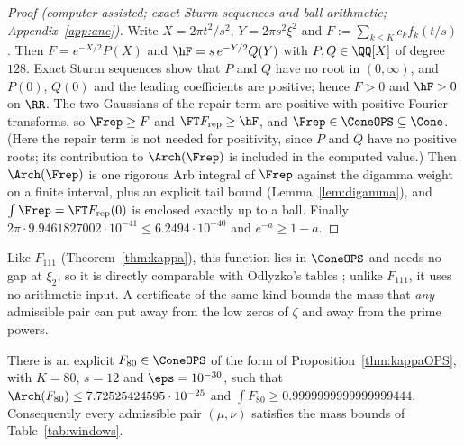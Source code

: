 \begin{proof}[Proof (computer-assisted; exact Sturm sequences and ball arithmetic; Appendix~\ref{app:anc})]
Write $X=2\pi t^2/s^2$, $Y=2\pi s^2\xi^2$ and $F:=\sum_{k\le K}c_kf_k(t/s)$. Then $F=e^{-X/2}P(X)$ and $\hF=s\,e^{-Y/2}Q(Y)$ with
$P,Q\in\QQ[X]$ of degree $128$. Exact Sturm sequences show that $P$ and $Q$ have no root in $(0,\infty)$, and $P(0)$,
$Q(0)$ and the leading coefficients are positive; hence $F>0$ and $\hF>0$ on $\RR$. The two Gaussians of the repair term are
positive with positive Fourier transforms, so $\Frep\ge F$ and $\FT F_{\mathrm{rep}}\ge\hF$, and $\Frep\in\ConeOPS\subseteq\Cone$. (Here
the repair term is not needed for positivity, since $P$ and $Q$ have no positive roots; its contribution to $\Arch(\Frep)$ is
included in the computed value.) Then $\Arch(\Frep)$ is one rigorous Arb integral of $\Frep$ against the digamma weight on a finite
interval, plus an explicit tail bound (Lemma~\ref{lem:digamma}), and $\int\Frep=\FT F_{\mathrm{rep}}(0)$ is enclosed exactly up to a ball. Finally
$2\pi\cdot9.9461827002\cdot10^{-41}\le6.2494\cdot10^{-40}$ and $e^{-a}\ge1-a$.
\end{proof}

Like $F_{111}$ (Theorem~\ref{thm:kappa}), this function lies in $\ConeOPS$ and needs no gap at $\xi_2$, so it is directly comparable with
Odlyzko's tables \cite[Table~4]{Odl90}; unlike $F_{111}$, it uses no arithmetic input. A certificate of the
same kind bounds the mass that \emph{any} admissible pair can put away from the low zeros of $\zeta$ and away from the prime powers.

\begin{proposition}\label{prop:lowheight}
There is an explicit $F_{80}\in\ConeOPS$ of the form of Proposition~\ref{thm:kappaOPS}, with $K=80$, $s=12$ and $\eps=10^{-30}$,
such that $\Arch(F_{80})\le7.72525424595\cdot10^{-25}$ and $\int F_{80}\ge0.9999999999999999444$. Consequently every admissible pair
$(\mu,\nu)$ satisfies the mass bounds of Table~\ref{tab:windows}.
\end{proposition}

